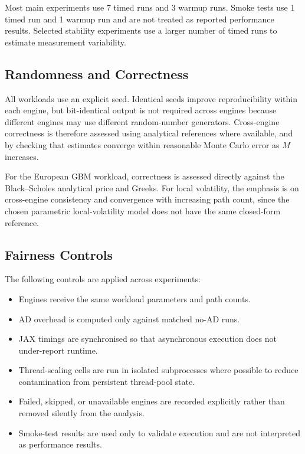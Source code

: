 Most main experiments use 7 timed runs and 3 warmup runs.  Smoke tests use
1 timed run and 1 warmup run and are not treated as reported performance
results.  Selected stability experiments use a larger number of timed runs
to estimate measurement variability.

\subsection{Randomness and Correctness}

All workloads use an explicit seed.  Identical seeds improve reproducibility
within each engine, but bit-identical output is not required across engines
because different engines may use different random-number generators.
Cross-engine correctness is therefore assessed using analytical references
where available, and by checking that estimates converge within reasonable
Monte Carlo error as \(M\) increases.

For the European GBM workload, correctness is assessed directly against the
Black--Scholes analytical price and Greeks.  For local volatility, the
emphasis is on cross-engine consistency and convergence with increasing path
count, since the chosen parametric local-volatility model does not have the
same closed-form reference.

\subsection{Fairness Controls}

The following controls are applied across experiments:

\begin{itemize}
    \item Engines receive the same workload parameters and path counts.
    \item AD overhead is computed only against matched no-AD runs.
    \item JAX timings are synchronised so that asynchronous execution does
    not under-report runtime.
    \item Thread-scaling cells are run in isolated subprocesses where
    possible to reduce contamination from persistent thread-pool state.
    \item Failed, skipped, or unavailable engines are recorded explicitly
    rather than removed silently from the analysis.
    \item Smoke-test results are used only to validate execution and are not
    interpreted as performance results.
\end{itemize}

